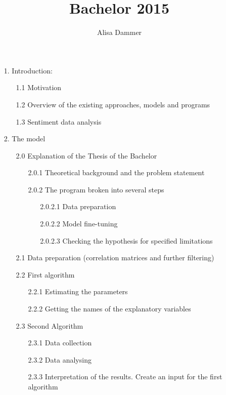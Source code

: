 \documentclass {article}
\title{Bachelor 2015}
\author{Alisa Dammer}
\begin{document}
\maketitle
 
\begin{enumerate}
	\item[1.] Introduction:
		\begin{enumerate}
			\item[1.1] Motivation
			\item[1.2] Overview of the existing approaches, models and programs
			\item[1.3] Sentiment data analysis
		\end{enumerate}
	\item[2.] The model
		\begin{enumerate}
			\item[2.0] Explanation of the Thesis of the Bachelor
				\begin{enumerate}
					\item[2.0.1] Theoretical background and the problem statement
					\item[2.0.2] The program broken into several steps
						\begin{enumerate}
							\item[2.0.2.1] Data preparation
							\item[2.0.2.2] Model fine-tuning
							\item[2.0.2.3] Checking the hypothesis for specified limitations
						\end{enumerate}
				\end{enumerate} 
			\item[2.1] Data preparation (correlation matrices and further filtering)
			\item[2.2] First algorithm
				\begin{enumerate}
					\item[2.2.1] Estimating the parameters
					\item[2.2.2] Getting the names of the explanatory variables
				\end{enumerate}
			\item[2.3] Second Algorithm
				\begin{enumerate}
					\item[2.3.1] Data collection
					\item[2.3.2] Data analysing
					\item[2.3.3] Interpretation of the results. Create an input for the first algorithm
				\end{enumerate}

\end{enumerate}
\end{enumerate}
\end{document}
